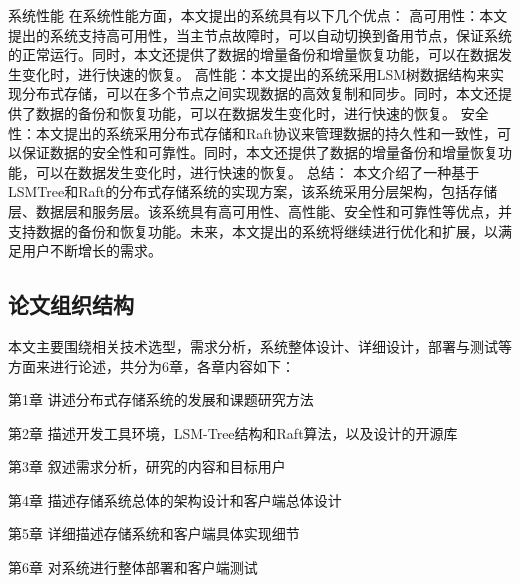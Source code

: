 系统性能
在系统性能方面，本文提出的系统具有以下几个优点：
高可用性：本文提出的系统支持高可用性，当主节点故障时，可以自动切换到备用节点，保证系统的正常运行。同时，本文还提供了数据的增量备份和增量恢复功能，可以在数据发生变化时，进行快速的恢复。
高性能：本文提出的系统采用LSM树数据结构来实现分布式存储，可以在多个节点之间实现数据的高效复制和同步。同时，本文还提供了数据的备份和恢复功能，可以在数据发生变化时，进行快速的恢复。
安全性：本文提出的系统采用分布式存储和Raft协议来管理数据的持久性和一致性，可以保证数据的安全性和可靠性。同时，本文还提供了数据的增量备份和增量恢复功能，可以在数据发生变化时，进行快速的恢复。
总结：
本文介绍了一种基于LSMTree和Raft的分布式存储系统的实现方案，该系统采用分层架构，包括存储层、数据层和服务层。该系统具有高可用性、高性能、安全性和可靠性等优点，并支持数据的备份和恢复功能。未来，本文提出的系统将继续进行优化和扩展，以满足用户不断增长的需求。

  	\subsection{论文组织结构}
  
  	本文主要围绕相关技术选型，需求分析，系统整体设计、详细设计，部署与测试等方面来进行论述，共分为6章，各章内容如下：
	
	第1章 讲述分布式存储系统的发展和课题研究方法
	
    第2章 描述开发工具环境，LSM-Tree结构和Raft算法，以及设计的开源库
    
    第3章 叙述需求分析，研究的内容和目标用户
    
    第4章 描述存储系统总体的架构设计和客户端总体设计
       
    第5章 详细描述存储系统和客户端具体实现细节
    
    第6章 对系统进行整体部署和客户端测试
    
    
\clearpage